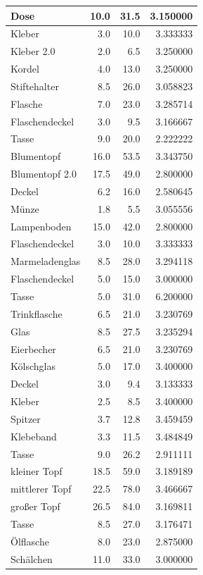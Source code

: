 \documentclass[
  ngerman,
]{book}
\begin{document}
\begin{table}[H]
\begin{tabular}[t]{l|r|r|r}
\hline
Dose & 10.0 & 31.5 & 3.150000\\
\hline
Kleber & 3.0 & 10.0 & 3.333333\\
\hline
Kleber 2.0 & 2.0 & 6.5 & 3.250000\\
\hline
Kordel & 4.0 & 13.0 & 3.250000\\
\hline
Stiftehalter & 8.5 & 26.0 & 3.058823\\
\hline
Flasche & 7.0 & 23.0 & 3.285714\\
\hline
Flaschendeckel & 3.0 & 9.5 & 3.166667\\
\hline
Tasse & 9.0 & 20.0 & 2.222222\\
\hline
Blumentopf & 16.0 & 53.5 & 3.343750\\
\hline
Blumentopf 2.0 & 17.5 & 49.0 & 2.800000\\
\hline
Deckel & 6.2 & 16.0 & 2.580645\\
\hline
Münze & 1.8 & 5.5 & 3.055556\\
\hline
Lampenboden & 15.0 & 42.0 & 2.800000\\
\hline
Flaschendeckel & 3.0 & 10.0 & 3.333333\\
\hline
Marmeladenglas & 8.5 & 28.0 & 3.294118\\
\hline
Flaschendeckel & 5.0 & 15.0 & 3.000000\\
\hline
Tasse & 5.0 & 31.0 & 6.200000\\
\hline
Trinkflasche & 6.5 & 21.0 & 3.230769\\
\hline
Glas & 8.5 & 27.5 & 3.235294\\
\hline
Eierbecher & 6.5 & 21.0 & 3.230769\\
\hline
Kölschglas & 5.0 & 17.0 & 3.400000\\
\hline
Deckel & 3.0 & 9.4 & 3.133333\\
\hline
Kleber & 2.5 & 8.5 & 3.400000\\
\hline
Spitzer & 3.7 & 12.8 & 3.459459\\
\hline
Klebeband & 3.3 & 11.5 & 3.484849\\
\hline
Tasse & 9.0 & 26.2 & 2.911111\\
\hline
kleiner Topf & 18.5 & 59.0 & 3.189189\\
\hline
mittlerer Topf & 22.5 & 78.0 & 3.466667\\
\hline
großer Topf & 26.5 & 84.0 & 3.169811\\
\hline
Tasse & 8.5 & 27.0 & 3.176471\\
\hline
Ölflasche & 8.0 & 23.0 & 2.875000\\
\hline
Schälchen & 11.0 & 33.0 & 3.000000\\

\end{tabular}
\end{table}
\end{document}
